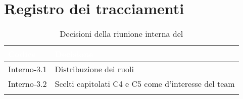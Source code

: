 \section{Registro dei tracciamenti}
{
\renewcommand{\arraystretch}{1.5}
\centering
\begin{longtable}{C{3cm} C{9cm}}
\textcolor{white}{\textbf{Codice}}&
\textcolor{white}{\textbf{Decisione}}\\	
\endhead
		
Interno-3.1 & Distribuzione dei ruoli\\

Interno-3.2 & Scelti capitolati C4 e C5 come  d'interesse del team\\
		
\caption{Decisioni della riunione interna del \Data{}}
\end{longtable}
}

